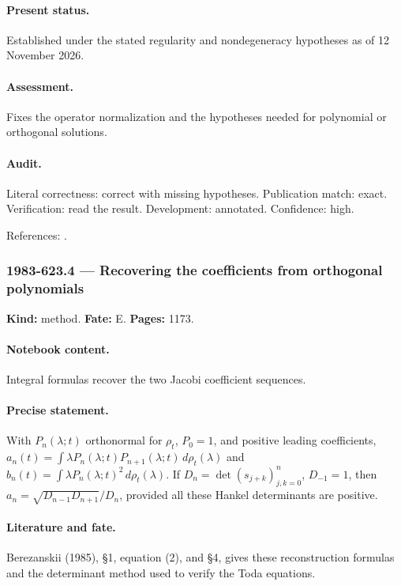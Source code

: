 \paragraph{Present status.} Established under the stated regularity and nondegeneracy hypotheses as of 12 November 2026.

\paragraph{Assessment.} Fixes the operator normalization and the hypotheses needed for polynomial or orthogonal solutions.

\paragraph{Audit.} Literal correctness: correct with missing hypotheses. Publication match: exact. Verification: read the result. Development: annotated. Confidence: high.

\noindent References: \citep{berezanskii1985integration}.\par

\subsubsection{1983-623.4 --- Recovering the coefficients from orthogonal polynomials}

\label{item:1983-623.4}

\noindent\textbf{Kind:} method. \textbf{Fate:} E. \textbf{Pages:} 1173.\par

\paragraph{Notebook content.} Integral formulas recover the two Jacobi coefficient sequences.

\paragraph{Precise statement.} With \(P_n(\lambda;t)\) orthonormal for \(\rho_t\), \(P_0=1\), and positive leading coefficients, \(a_n(t)=\int\lambda P_n(\lambda;t)P_{n+1}(\lambda;t)\,d\rho_t(\lambda)\) and \(b_n(t)=\int\lambda P_n(\lambda;t)^2\,d\rho_t(\lambda)\). If \(D_n=\det(s_{j+k})_{j,k=0}^n\), \(D_{-1}=1\), then \(a_n=\sqrt{D_{n-1}D_{n+1}}/D_n\), provided all these Hankel determinants are positive.

\paragraph{Literature and fate.} Berezanskii (1985), \S1, equation (2), and \S4, gives these reconstruction formulas and the determinant method used to verify the Toda equations.

